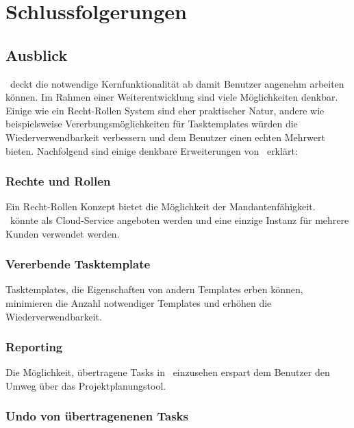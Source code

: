 \chapter{Schlussfolgerungen}
	
	
	
	
	\section{Ausblick}
		\eeppi\ deckt die notwendige Kernfunktionalität ab damit Benutzer angenehm arbeiten können.
		Im Rahmen einer Weiterentwicklung sind viele Möglichkeiten denkbar. 
		Einige wie ein Recht-Rollen System sind eher praktischer Natur, 
		andere wie beispielsweise Vererbungsmöglichkeiten für Tasktemplates würden die Wiederverwendbarkeit verbessern und dem Benutzer einen echten Mehrwert bieten.
		Nachfolgend sind einige denkbare Erweiterungen von \eeppi\ erklärt:
		
		\subsection{Rechte und Rollen}
			
			Ein Recht-Rollen Konzept bietet die Möglichkeit der Mandantenfähigkeit.
			\eeppi\ könnte als Cloud-Service angeboten werden und eine einzige Instanz für mehrere Kunden verwendet werden.
		
		
		\subsection{Vererbende Tasktemplate}
		
			Tasktemplates, die Eigenschaften von andern Templates erben können, 
			minimieren die Anzahl notwendiger Templates und erhöhen die Wiederverwendbarkeit.
			
		
		\subsection{Reporting}
		
			Die Möglichkeit, übertragene Tasks in \eeppi\ einzusehen erspart dem Benutzer den Umweg über das Projektplanungstool.
		
		
		\subsection{Undo von übertragenenen Tasks}
		
